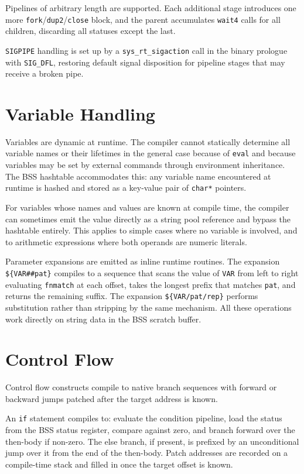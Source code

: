 \documentclass[10pt,twocolumn]{article}
\begin{document}
Pipelines of arbitrary length are supported. Each additional stage
introduces one more \texttt{fork}/\texttt{dup2}/\texttt{close} block,
and the parent accumulates \texttt{wait4} calls for all children,
discarding all statuses except the last.

\texttt{SIGPIPE} handling is set up by a \texttt{sys\_rt\_sigaction}
call in the binary prologue with \texttt{SIG\_DFL}, restoring default
signal disposition for pipeline stages that may receive a broken pipe.


\section{Variable Handling}

Variables are dynamic at runtime. The compiler cannot statically
determine all variable names or their lifetimes in the general case
because of \texttt{eval} and because variables may be set by external
commands through environment inheritance. The BSS hashtable
accommodates this: any variable name encountered at runtime is hashed
and stored as a key-value pair of \texttt{char*} pointers.

For variables whose names and values are known at compile time, the
compiler can sometimes emit the value directly as a string pool
reference and bypass the hashtable entirely. This applies to simple
cases where no variable is involved, and to arithmetic expressions
where both operands are numeric literals.

Parameter expansions are emitted as inline runtime routines. The
expansion \texttt{\$\{VAR\#\#pat\}} compiles to a sequence that scans
the value of \texttt{VAR} from left to right evaluating
\texttt{fnmatch} at each offset, takes the longest prefix that matches
\texttt{pat}, and returns the remaining suffix. The expansion
\texttt{\$\{VAR/pat/rep\}} performs substitution rather than stripping
by the same mechanism. All these operations work directly on string
data in the BSS scratch buffer.


\section{Control Flow}

Control flow constructs compile to native branch sequences with
forward or backward jumps patched after the target address is known.

An \texttt{if} statement compiles to: evaluate the condition pipeline,
load the status from the BSS status register, compare against zero,
and branch forward over the then-body if non-zero. The else branch, if
present, is prefixed by an unconditional jump over it from the end of
the then-body. Patch addresses are recorded on a compile-time stack
and filled in once the target offset is known.
\end{document}

